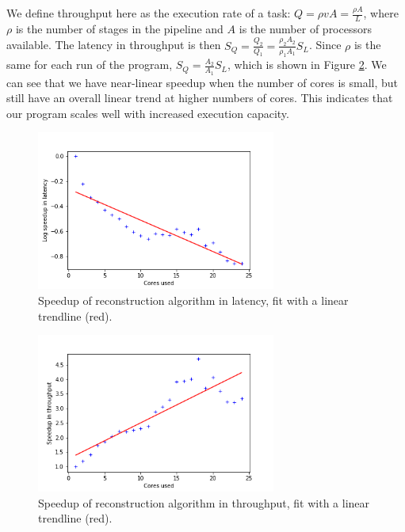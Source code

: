 We define throughput here as the execution rate of a task: $Q = \rho v A = \frac{\rho A}{L}$, where $\rho$ is the number of stages in the pipeline and $A$ is the number of processors available. The latency in throughput is then $S_Q = \frac{Q_2}{Q_1} = \frac{\rho_2 A_2}{\rho_1 A_1} S_L$. Since $\rho$ is the same for each run of the program, $S_Q = \frac{A_2}{A_1} S_L$, which is shown in Figure \ref{fig:through_speedup}. We can see that we have near-linear speedup when the number of cores is small, but still have an overall linear trend at higher numbers of cores. This indicates that our program scales well with increased execution capacity.

\begin{figure}
    \centering
    \includegraphics[width=0.7\textwidth]{graphs/Cassini_latency_speedup.png}
    \caption{Speedup of reconstruction algorithm in latency, fit with a linear trendline (red).}
    \label{fig:latency_speedup}
\end{figure}

\begin{figure}
    \centering
    \includegraphics[width=0.7\textwidth]{graphs/Cassini_throughput_speedup.png}
    \caption{Speedup of reconstruction algorithm in throughput, fit with a linear trendline (red).}
    \label{fig:through_speedup}
\end{figure}

